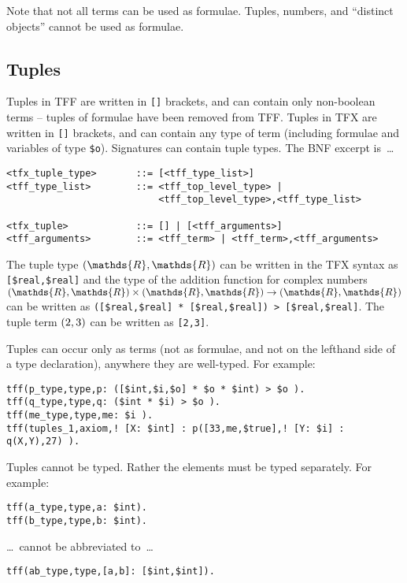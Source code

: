 \documentclass{easychair}
\begin{document}
Note that not all terms can be used as formulae.
Tuples, numbers, and ``distinct objects'' cannot be used as formulae.

\subsection{Tuples}

Tuples in TFF are written in {\tt []} brackets, and can contain only
non-boolean terms -- tuples of formulae have been removed from TFF. 
Tuples in TFX are written in {\tt []} brackets, and can contain any type of 
term (including formulae and variables of type {\tt \$o}). 
Signatures can contain tuple types. 
The BNF excerpt is~\ldots
\begin{verbatim}
<tfx_tuple_type>       ::= [<tff_type_list>]
<tff_type_list>        ::= <tff_top_level_type> |
                           <tff_top_level_type>,<tff_type_list>

<tfx_tuple>            ::= [] | [<tff_arguments>]
<tff_arguments>        ::= <tff_term> | <tff_term>,<tff_arguments>
\end{verbatim}

The tuple type $\tuple{\mathds{R},\mathds{R}}$ can be written in the TFX syntax as \verb|[$real,$real]| and the type of the addition function for complex numbers $\tuple{\mathds{R},\mathds{R}} \times \tuple{\mathds{R},\mathds{R}} \to \tuple{\mathds{R},\mathds{R}}$ can be written as
\verb'([$real,$real] * [$real,$real]) > [$real,$real]'. 
The tuple term $({2,3})$ can be written as \verb'[2,3]'.

Tuples can occur only as terms (not as formulae, and not on the lefthand side 
of a type declaration), anywhere they are well-typed. 
For example:
\begin{verbatim}
tff(p_type,type,p: ([$int,$i,$o] * $o * $int) > $o ).
tff(q_type,type,q: ($int * $i) > $o ).
tff(me_type,type,me: $i ).
tff(tuples_1,axiom,! [X: $int] : p([33,me,$true],! [Y: $i] : q(X,Y),27) ).
\end{verbatim}

Tuples cannot be typed. Rather the elements must be typed separately. 
For example:
\begin{verbatim}
tff(a_type,type,a: $int).
tff(b_type,type,b: $int).
\end{verbatim}
\ldots~cannot be abbreviated to~\ldots
\begin{verbatim}
tff(ab_type,type,[a,b]: [$int,$int]).
\end{verbatim}
\end{document}
